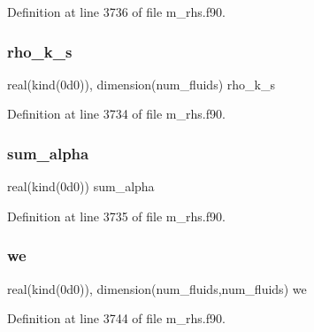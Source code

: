 Definition at line 3736 of file m\+\_\+rhs.\+f90.

\mbox{\label{m__rhs_8f90_aa5195db0f89eb91b6f5544e9764412a0}} 
\subsubsection{\texorpdfstring{rho\+\_\+k\+\_\+s}{rho\_k\_s}}
{\footnotesize\ttfamily real(kind(0d0)), dimension(num\+\_\+fluids) rho\+\_\+k\+\_\+s}



Definition at line 3734 of file m\+\_\+rhs.\+f90.

\mbox{\label{m__rhs_8f90_a796247036b68f5c2f04db3b4c943b5f2}} 
\subsubsection{\texorpdfstring{sum\+\_\+alpha}{sum\_alpha}}
{\footnotesize\ttfamily real(kind(0d0)) sum\+\_\+alpha}



Definition at line 3735 of file m\+\_\+rhs.\+f90.

\mbox{\label{m__rhs_8f90_a19a438a95f2945b7c9e492f2ee983263}} 
\subsubsection{\texorpdfstring{we}{we}}
{\footnotesize\ttfamily real(kind(0d0)), dimension(num\+\_\+fluids,num\+\_\+fluids) we}



Definition at line 3744 of file m\+\_\+rhs.\+f90.

